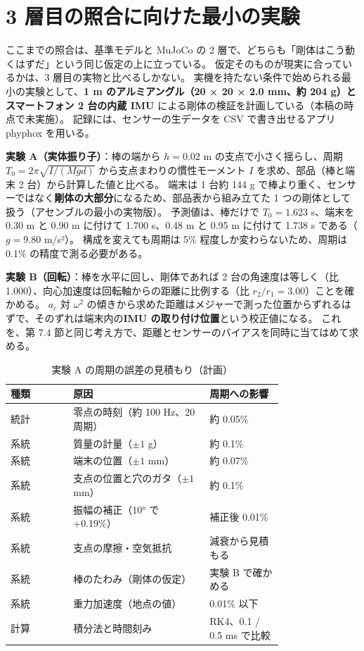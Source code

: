\documentclass[paper=a4paper,fontsize=10pt,twocolumn,column_gap=2zw,line_length=24zw,number_of_lines=46,head_space=20mm]{jlreq}
\begin{document}
\section{3 層目の照合に向けた最小の実験}

ここまでの照合は、基準モデルと MuJoCo の 2 層で、どちらも「剛体はこう動くはずだ」という同じ仮定の上に立っている。
仮定そのものが現実に合っているかは、3 層目の実物と比べるしかない。
実機を持たない条件で始められる最小の実験として、\textbf{1 m のアルミアングル（20 × 20 × 2.0 mm、約 204 g）とスマートフォン 2 台の内蔵 IMU} による剛体の検証を計画している（本稿の時点で未実施）。
記録には、センサーの生データを CSV で書き出せるアプリ phyphox \cite{phyphox} を用いる。

\textbf{実験 A（実体振り子）}：棒の端から $h=0.02$ m の支点で小さく揺らし、周期 $T_0=2\pi\sqrt{I/(Mgd)}$ から支点まわりの慣性モーメント $I$ を求め、部品（棒と端末 2 台）から計算した値と比べる。
端末は 1 台約 144 g で棒より重く、センサーではなく\textbf{剛体の大部分}になるため、部品表から組み立てた 1 つの剛体として扱う（アセンブルの最小の実物版）。
予測値は、棒だけで $T_0=1.623$ s、端末を 0.30 m と 0.90 m に付けて 1.700 s、0.48 m と 0.95 m に付けて 1.738 s である（$g=9.80$ m/s²）。
構成を変えても周期は 5\% 程度しか変わらないため、周期は 0.1\% の精度で測る必要がある。

\textbf{実験 B（回転）}：棒を水平に回し、剛体であれば 2 台の角速度は等しく（比 1.000）、向心加速度は回転軸からの距離に比例する（比 $r_2/r_1=3.00$）ことを確かめる。
$a_c$ 対 $\omega^2$ の傾きから求めた距離はメジャーで測った位置からずれるはずで、そのずれは端末内の\textbf{IMU の取り付け位置}という校正値になる。
これを、第 7.4 節と同じ考え方で、距離とセンサーのバイアスを同時に当てはめて求める。

\begin{table}[t]\centering\small
\caption{実験 A の周期の誤差の見積もり（計画）}\label{tab:bangai}
\setlength{\tabcolsep}{3pt}
\begin{tabular}{lp{0.5\linewidth}p{0.27\linewidth}}\toprule
種類 & 原因 & 周期への影響 \\\midrule
統計 & 零点の時刻（約 100 Hz、20 周期） & 約 0.05\% \\
系統 & 質量の計量（$\pm1$ g） & 約 0.1\% \\
系統 & 端末の位置（$\pm1$ mm） & 約 0.07\% \\
系統 & 支点の位置と穴のガタ（$\pm1$ mm） & 約 0.1\% \\
系統 & 振幅の補正（10° で +0.19\%） & 補正後 0.01\% \\
系統 & 支点の摩擦・空気抵抗 & 減衰から見積もる \\
系統 & 棒のたわみ（剛体の仮定） & 実験 B で確かめる \\
系統 & 重力加速度（地点の値） & 0.01\% 以下 \\
計算 & 積分法と時間刻み & RK4、0.1 / 0.5 ms で比較 \\\bottomrule
\end{tabular}
\end{table}
\end{document}
